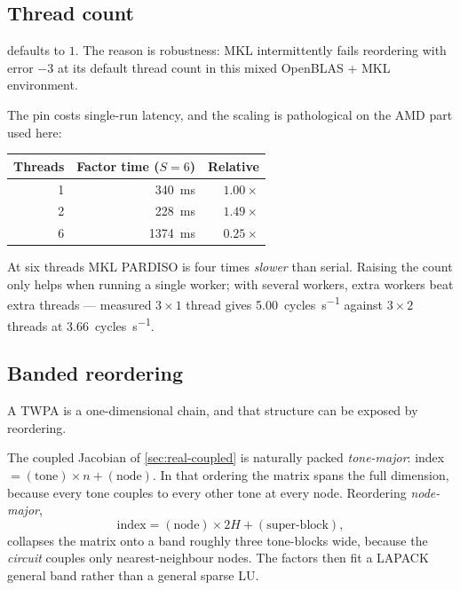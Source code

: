 \subsection{Thread count}

\begin{implnote}
 defaults to $1$. The reason is robustness: MKL
intermittently fails reordering with error $-3$ at its default thread count in
this mixed OpenBLAS + MKL environment.

The pin costs single-run latency, and the scaling is pathological on the AMD
part used here:
\begin{center}
\begin{tabular}{@{}r r r@{}}
\toprule
Threads & Factor time ($S=6$) & Relative \\
\midrule
1 & \SI{340}{\milli\second} & $1.00\times$ \\
2 & \SI{228}{\milli\second} & $1.49\times$ \\
6 & \SI{1374}{\milli\second} & $0.25\times$ \\
\bottomrule
\end{tabular}
\end{center}
At six threads MKL PARDISO is four times \emph{slower} than serial. Raising the
count only helps when running a single worker; with several workers, extra
workers beat extra threads --- measured $3\times1$ thread gives
\SI{5.00}{cycles\per\second} against $3\times2$ threads at
\SI{3.66}{cycles\per\second}.
\end{implnote}

\subsection{Banded reordering}
\label{sec:banded}

A TWPA is a one-dimensional chain, and that structure can be exposed by
reordering.

The coupled Jacobian of \cref{sec:real-coupled} is naturally packed
\emph{tone-major}: index $= (\text{tone})\times n + (\text{node})$. In that
ordering the matrix spans the full dimension, because every tone couples to
every other tone at every node. Reordering \emph{node-major},
\begin{equation}
  \text{index} = (\text{node})\times 2H + (\text{super-block}),
\end{equation}
collapses the matrix onto a band roughly three tone-blocks wide, because the
\emph{circuit} couples only nearest-neighbour nodes. The factors then fit a
LAPACK general band rather than a general sparse LU.

